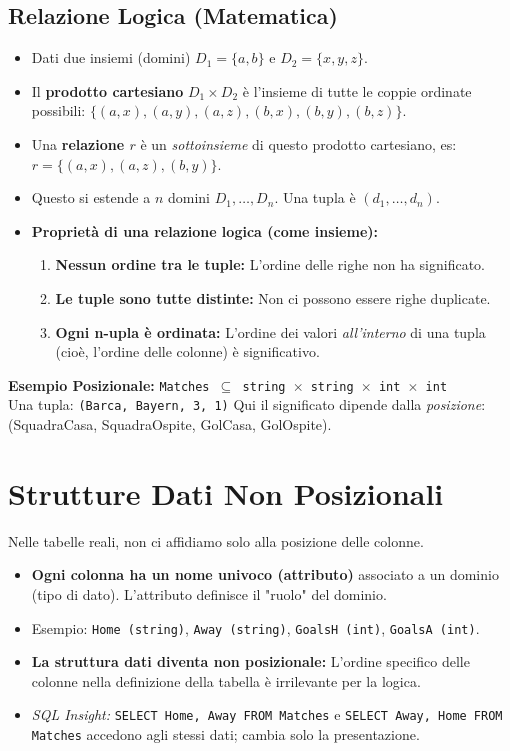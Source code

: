 \documentclass{article}
\begin{document}
	\subsection{Relazione Logica (Matematica)}
	\begin{itemize}
		\item Dati due insiemi (domini) $D_1 = \{a,b\}$ e $D_2 = \{x,y,z\}$.
		\item Il \textbf{prodotto cartesiano} $D_1 \times D_2$ è l'insieme di tutte le coppie ordinate possibili: $\{(a,x), (a,y), (a,z), (b,x), (b,y), (b,z)\}$.
		\item Una \textbf{relazione $r$} è un \textit{sottoinsieme} di questo prodotto cartesiano, es: $r = \{(a,x), (a,z), (b,y)\}$.
		\item Questo si estende a $n$ domini $D_1, \dots, D_n$. Una tupla è $(d_1, \dots, d_n)$.
		\item \textbf{Proprietà di una relazione logica (come insieme):}
		\begin{enumerate}
			\item \textbf{Nessun ordine tra le tuple:} L'ordine delle righe non ha significato.
			\item \textbf{Le tuple sono tutte distinte:} Non ci possono essere righe duplicate.
			\item \textbf{Ogni n-upla è ordinata:} L'ordine dei valori \textit{all'interno} di una tupla (cioè, l'ordine delle colonne) è significativo.
		\end{enumerate}
	\end{itemize}
	\textbf{Esempio Posizionale:}
	\texttt{Matches $\subseteq$ string $\times$ string $\times$ int $\times$ int} \\
	Una tupla: \texttt{(Barca, Bayern, 3, 1)}
	Qui il significato dipende dalla \textit{posizione}: (SquadraCasa, SquadraOspite, GolCasa, GolOspite).
	
	\section{Strutture Dati Non Posizionali}
	Nelle tabelle reali, non ci affidiamo solo alla posizione delle colonne.
	\begin{itemize}
		\item \textbf{Ogni colonna ha un nome univoco (attributo)} associato a un dominio (tipo di dato). L'attributo definisce il "ruolo" del dominio.
		\item Esempio: \texttt{Home (string)}, \texttt{Away (string)}, \texttt{GoalsH (int)}, \texttt{GoalsA (int)}.
		\item \textbf{La struttura dati diventa non posizionale:} L'ordine specifico delle colonne nella definizione della tabella è irrilevante per la logica.
		\item \textit{SQL Insight:} \texttt{SELECT Home, Away FROM Matches} e \texttt{SELECT Away, Home FROM Matches} accedono agli stessi dati; cambia solo la presentazione.
	\end{itemize}
	
\end{document}
